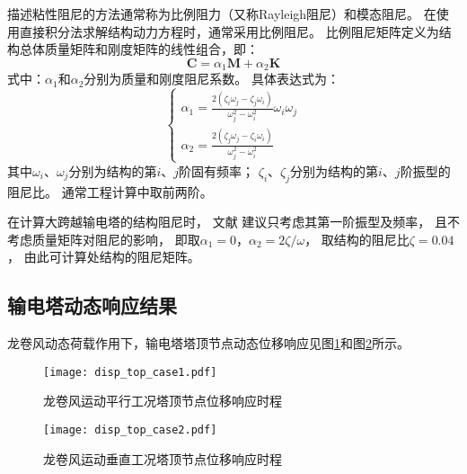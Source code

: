 描述粘性阻尼的方法通常称为比例阻力（又称Rayleigh阻尼）和模态阻尼。
在使用直接积分法求解结构动力方程时，通常采用比例阻尼。
比例阻尼矩阵定义为结构总体质量矩阵和刚度矩阵的线性组合，即：
\begin{equation}
  \bm{C} = \alpha_1 \bm{M} + \alpha_2 \bm{K}
\end{equation}
式中：$\alpha_1$和$\alpha_2$分别为质量和刚度阻尼系数。
具体表达式为：
\begin{equation}
    \begin{cases}
        \alpha_1 = \frac{2\left(\zeta_i\omega_j-\zeta_j \omega_i\right)}{\omega_j^2-\omega_i^2} \omega_i \omega_j \\
        \alpha_2 = \frac{2\left(\zeta_j \omega_j-\zeta_i \omega_i\right)}{\omega_j^2-\omega_i^2} 
    \end{cases}
\end{equation}
其中$\omega_i$、$\omega_j$分别为结构的第$i$、$j$阶固有频率；
$\zeta_i$、$\zeta_j$分别为结构的第$i$、$j$阶振型的阻尼比。
通常工程计算中取前两阶。

在计算大跨越输电塔的结构阻尼时，
文献\cite{wong2009guidelines}\cite{loredo2003influence}\cite{madugula2001dynamic}\cite{ostendorp1997damping}
建议只考虑其第一阶振型及频率，
且不考虑质量矩阵对阻尼的影响，
即取$\alpha_1=0$，$\alpha_2=2\zeta/\omega$，
取结构的阻尼比$\zeta=0.04$\cite{loredo2003influence}，
由此可计算处结构的阻尼矩阵。

\subsection{输电塔动态响应结果}

龙卷风动态荷载作用下，输电塔塔顶节点动态位移响应见图\ref{fig:disp_top_case1}和图\ref{fig:disp_top_case2}所示。
\begin{figure}[!htpb]
    \centering
    \texttt{[image: disp\_top\_case1.pdf]}
    \caption{龙卷风运动平行工况塔顶节点位移响应时程}
    \label{fig:disp_top_case1}
\end{figure}
\begin{figure}[!htpb]
    \centering
    \texttt{[image: disp\_top\_case2.pdf]}
    \caption{龙卷风运动垂直工况塔顶节点位移响应时程}
    \label{fig:disp_top_case2}
\end{figure}
